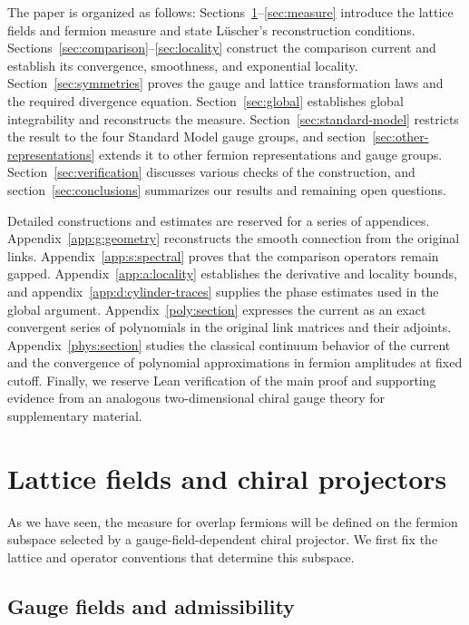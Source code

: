 \documentclass[11pt,a4paper]{article}
\theoremstyle{remark}
\begin{document}
The paper is organized as follows: Sections~\ref{sec:lattice}--\ref{sec:measure} introduce the lattice fields and fermion measure and state L\"uscher's reconstruction conditions. Sections~\ref{sec:comparison}--\ref{sec:locality} construct the comparison current and establish its convergence, smoothness, and exponential locality. Section~\ref{sec:symmetries} proves the gauge and lattice transformation laws and the required divergence equation. Section~\ref{sec:global} establishes global integrability and reconstructs the measure. Section~\ref{sec:standard-model} restricts the result to the four Standard Model gauge groups, and section~\ref{sec:other-representations} extends it to other fermion representations and gauge groups. Section~\ref{sec:verification} discusses various checks of the construction, and section~\ref{sec:conclusions} summarizes our results and remaining open questions.

Detailed constructions and estimates are reserved for a series of appendices. Appendix~\ref{app:g:geometry} reconstructs the smooth connection from the original links. Appendix~\ref{app:s:spectral} proves that the comparison operators remain gapped. Appendix~\ref{app:a:locality} establishes the derivative and locality bounds, and appendix~\ref{app:d:cylinder-traces} supplies the phase estimates used in the global argument. Appendix~\ref{poly:section} expresses the current as an exact convergent series of polynomials in the original link matrices and their adjoints. Appendix~\ref{phys:section} studies the classical continuum behavior of the current and the convergence of polynomial approximations in fermion amplitudes at fixed cutoff. Finally, we reserve Lean verification of the main proof and supporting evidence from an analogous two-dimensional chiral gauge theory for supplementary material.


\section{Lattice fields and chiral projectors}
\label{sec:lattice}

As we have seen, the measure for overlap fermions will be defined on the fermion subspace selected by a
gauge-field-dependent chiral projector. We first fix the lattice and operator conventions that determine this subspace.

\subsection{Gauge fields and admissibility}
\end{document}
